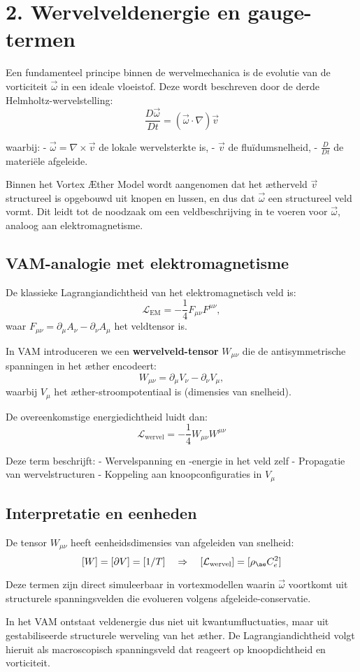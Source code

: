\section*{2. Wervelveldenergie en gauge-termen}

Een fundamenteel principe binnen de wervelmechanica is de evolutie van de vorticiteit $\vec{\omega}$ in een ideale vloeistof. Deze wordt beschreven door de derde Helmholtz-wervelstelling:
\[
    \frac{D \vec{\omega}}{Dt} = (\vec{\omega} \cdot \nabla) \vec{v}
\]

waarbij:
- $\vec{\omega} = \nabla \times \vec{v}$ de lokale wervelsterkte is,
- $\vec{v}$ de fluïdumsnelheid,
- $\frac{D}{Dt}$ de materiële afgeleide.

Binnen het Vortex Æther Model wordt aangenomen dat het ætherveld $\vec{v}$ structureel is opgebouwd uit knopen en lussen, en dus dat $\vec{\omega}$ een structureel veld vormt. Dit leidt tot de noodzaak om een veldbeschrijving in te voeren voor $\vec{\omega}$, analoog aan elektromagnetisme.

\subsection*{VAM-analogie met elektromagnetisme}
De klassieke Lagrangiandichtheid van het elektromagnetisch veld is:
\[
    \mathcal{L}_\text{EM} = -\frac{1}{4} F_{\mu\nu} F^{\mu\nu},
\]
waar $F_{\mu\nu} = \partial_\mu A_\nu - \partial_\nu A_\mu$ het veldtensor is.

In VAM introduceren we een \textbf{wervelveld-tensor} $W_{\mu\nu}$ die de antisymmetrische spanningen in het æther encodeert:
\[
    W_{\mu\nu} = \partial_\mu V_\nu - \partial_\nu V_\mu,
\]
waarbij $V_\mu$ het æther-stroompotentiaal is (dimensies van snelheid).

De overeenkomstige energiedichtheid luidt dan:
\[
    \mathcal{L}_\text{wervel} = -\frac{1}{4} W_{\mu\nu} W^{\mu\nu}
\]

Deze term beschrijft:
- Wervelspanning en -energie in het veld zelf
- Propagatie van wervelstructuren
- Koppeling aan knoopconfiguraties in $V_\mu$

\subsection*{Interpretatie en eenheden}
De tensor $W_{\mu\nu}$ heeft eenheidsdimensies van afgeleiden van snelheid:
\[
    [W] = [\partial V] = [1/T] \quad \Rightarrow \quad [\mathcal{L}_\text{wervel}] = [\rho_{\ae} C_e^2]
\]

Deze termen zijn direct simuleerbaar in vortexmodellen waarin $\vec{\omega}$ voortkomt uit structurele spanningsvelden die evolueren volgens afgeleide-conservatie.

In het VAM ontstaat veldenergie dus niet uit kwantumfluctuaties, maar uit gestabiliseerde structurele werveling van het æther. De Lagrangiandichtheid volgt hieruit als macroscopisch spanningsveld dat reageert op knoopdichtheid en vorticiteit.